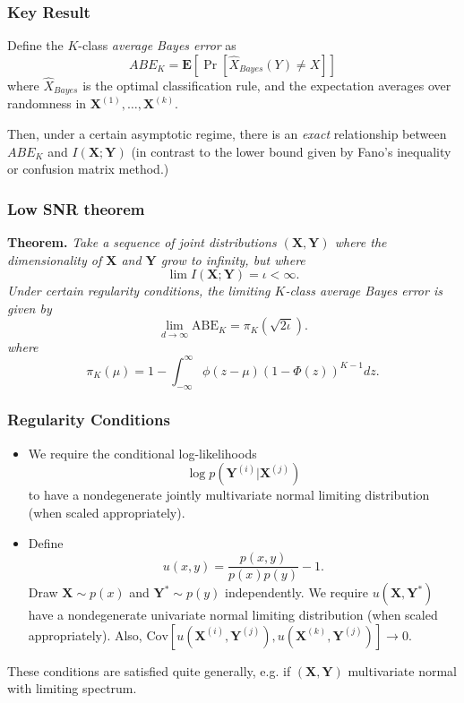 \documentclass{beamer}
\newcommand{\bX}{\boldsymbol{X}}
\newcommand{\bY}{\boldsymbol{Y}}
\newcommand{\E}{\textbf{E}}
\newcommand{\Cov}{\text{Cov}}
\begin{document}
\begin{frame}
\frametitle{Key Result}
Define the $K$-class \emph{average Bayes error} as
\[
ABE_K = \E[\Pr[\hat{X}_{Bayes}(Y) \neq X]]
\]
where $\hat{X}_{Bayes}$ is the optimal classification rule,
and the expectation averages over randomness in
$\bX^{(1)},\hdots, \bX^{(k)}$.

\vspace{0.3in}

Then, under a certain asymptotic regime,
there is an \emph{exact} relationship between $ABE_K$ and $I(\bX;\bY)$
(in contrast to the lower bound given by Fano's inequality or confusion matrix method.)

\end{frame}







\begin{frame}
\frametitle{Low SNR theorem}

\textbf{Theorem. }\emph{
Take a sequence of joint distributions $(\bX, \bY)$ where
the dimensionality of $\bX$ and $\bY$ grow to infinity,
but where
\[\lim I(\bX; \bY) = \iota < \infty.\]
Under certain regularity conditions, the limiting $K$-class average Bayes error is given by
\[
\lim_{d \to \infty} \text{ABE}_K = \pi_K(\sqrt{2\iota}).
\]
where
\[
\pi_K(\mu) =  1 - \int_{-\infty}^\infty \phi(z-\mu) (1-\Phi(z))^{K-1} dz.
\]
}
\end{frame}

{

}


\begin{frame}
\frametitle{Regularity Conditions}
\begin{itemize}
\item We require the conditional log-likelihoods
\[
\log p(\bY^{(i)}|\bX^{(j)})
\]
to have a nondegenerate jointly multivariate normal limiting distribution (when scaled appropriately).
\item Define
\[
u(x, y) = \frac{p(x, y)}{p(x)p(y)} - 1.
\]
Draw $\bX \sim p(x)$ and $\bY^* \sim p(y)$ independently.
We require $u(\bX, \bY^*)$ have a
nondegenerate univariate normal limiting distribution (when scaled appropriately).  Also, $\Cov[u(\bX^{(i)}, \bY^{(j)}), u(\bX^{(k)}, \bY^{(j)})] \to 0.$
\end{itemize}
These conditions are satisfied quite generally, e.g. if $(\bX, \bY)$ multivariate normal with limiting spectrum.
\end{frame}
\end{document}
